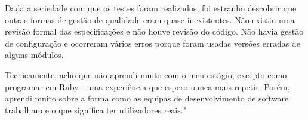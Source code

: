 \documentclass{article}
\begin{document}
Dada a seriedade com que os testes foram realizados, foi estranho descobrir que outras formas de gestão de qualidade eram quase inexistentes. Não existiu uma revisão formal das especificações e não houve revisão do código. Não havia gestão de configuração e ocorreram vários erros porque foram usadas versões erradas de alguns módulos.

Tecnicamente, acho que não aprendi muito com o meu estágio, excepto como programar em Ruby - uma experiência que espero nunca mais repetir. Porém, aprendi muito sobre a forma como as equipas de desenvolvimento de software trabalham e o que significa ter utilizadores reais."


\cleardoublepage


\label{referencias}
\end{document}
